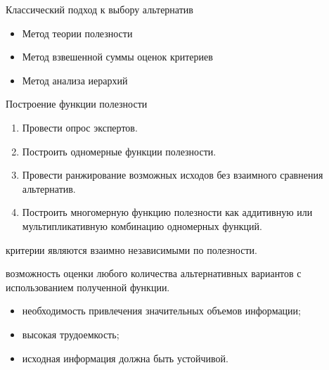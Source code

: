 \documentclass[unicode,11pt,notheorems,xcolor=table]{beamer}
\begin{document}
\begin{frame}{Классический подход к выбору альтернатив}{}
\begin{itemize}
    \item Метод теории полезности
    \item Метод взвешенной суммы оценок критериев 
    \item Метод анализа иерархий
\end{itemize}
\end{frame}

\begin{frame}[allowframebreaks]{Построение функции полезности}{}
\begin{enumerate}
    \item Провести опрос экспертов.
    \item Построить одномерные функции полезности.
    \item Провести ранжирование возможных исходов без взаимного сравнения альтернатив.
    \item Построить многомерную функцию полезности как аддитивную или мультипликативную комбинацию одномерных функций.
\end{enumerate}

    \bigskip
     критерии являются взаимно независимыми по полезности. 

    \framebreak
    \bigskip
    
    \medskip
    возможность оценки любого количества альтернативных вариантов с использованием полученной функции. 
    
    \bigskip
    \begin{itemize}
        \item необходимость привлечения значительных объемов информации; 
        \item высокая трудоемкость;
        \item исходная информация должна быть устойчивой. 
    \end{itemize}
    
    
\end{frame}
\end{document}
